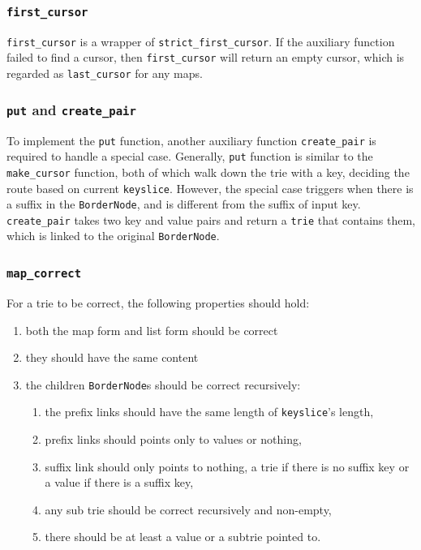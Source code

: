 \documentclass[runningheads]{llncs}
\begin{document}
\subsubsection{\texttt{first\_cursor}}

\texttt{first\_cursor} is a wrapper of \texttt{strict\_first\_cursor}. If the
auxiliary function failed to find a cursor, then \texttt{first\_cursor} will
return an empty cursor, which is regarded as \texttt{last\_cursor} for any
maps.  

\subsubsection{\texttt{put} and \texttt{create\_pair}}

To implement the \texttt{put} function, another auxiliary function
\texttt{create\_pair} is required to handle a special case. Generally,
\texttt{put} function is similar to the \texttt{make\_cursor} function, both of
which walk down the trie with a key, deciding the route based on current
\texttt{keyslice}. However, the special case triggers when there is a suffix in
the \texttt{BorderNode}, and is different from the suffix of input key.
\texttt{create\_pair} takes two key and value pairs and return a \texttt{trie}
that contains them, which is linked to the original \texttt{BorderNode}.

\subsubsection{\texttt{map\_correct}}

For a trie to be correct, the following properties should hold:

\begin{enumerate}
\item both the map form and list form should be correct
\item they should have the same content
\item the children \texttt{BorderNode}s should be correct recursively:
  \begin{enumerate}
  \item the prefix links should have the same length of \texttt{keyslice}'s
    length,
  \item prefix links should points only to values or nothing,
  \item suffix link should only points to nothing, a trie if there is no suffix
    key or a value if there is a suffix key,
  \item any sub trie should be correct recursively and non-empty,
  \item there should be at least a value or a subtrie pointed to.
  \end{enumerate}
\end{enumerate}
\end{document}
